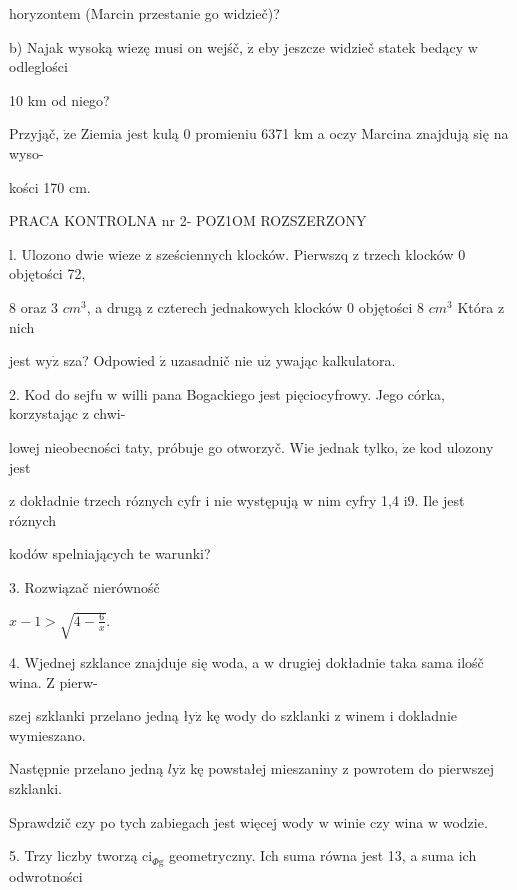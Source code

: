 \documentclass[a4paper,12pt]{article}
\begin{document}
horyzontem (Marcin przestanie go widzieč)?

b) Najak wysoką wiezę musi on wejśč, $\dot{\mathrm{z}}$ eby jeszcze widzieč statek bedący $\mathrm{w}$ odleglości

10 km od niego?

Przyjąč, $\dot{\mathrm{z}}\mathrm{e}$ Ziemia jest kulą $0$ promieniu 6371 km a oczy Marcina znajdują się na wyso-

kości 170 cm.




PRACA KONTROLNA nr 2- POZ1OM ROZSZERZONY

l. Ulozono dwie wieze $\mathrm{z}$ sześciennych klocków. Pierwszq $\mathrm{z}$ trzech klocków $0$ objętości 72,

8 oraz 3 $cm^{3}$, a drugą $\mathrm{z}$ czterech jednakowych klocków $0$ objętości 8 $cm^{3}$ Która $\mathrm{z}$ nich

jest $\mathrm{w}\mathrm{y}\dot{\mathrm{z}}$ sza? Odpowied $\acute{\mathrm{z}}$ uzasadnič nie $\mathrm{u}\dot{\mathrm{z}}$ ywając kalkulatora.

2. Kod do sejfu $\mathrm{w}$ willi pana Bogackiego jest pięciocyfrowy. Jego córka, korzystając $\mathrm{z}$ chwi-

lowej nieobecności taty, próbuje go otworzyč. Wie jednak tylko, $\dot{\mathrm{z}}\mathrm{e}$ kod ulozony jest

$\mathrm{z}$ dokładnie trzech róznych cyfr $\mathrm{i}$ nie występują $\mathrm{w}$ nim cyfry 1,4 $\mathrm{i}9$. Ile jest róznych

kodów spelniających te warunki?

3. Rozwiązač nierównośč

$x-1>\sqrt{4-\frac{6}{x}}.$

4. Wjednej szklance znajduje się woda, a $\mathrm{w}$ drugiej dokładnie taka sama ilośč wina. $\mathrm{Z}$ pierw-

szej szklanki przelano jedną $\text{ł} \mathrm{y}\dot{\mathrm{z}}$ kę wody do szklanki $\mathrm{z}$ winem $\mathrm{i}$ dokladnie wymieszano.

Następnie przelano jedną $l\mathrm{y}\dot{\mathrm{z}}$ kę powstałej mieszaniny $\mathrm{z}$ powrotem do pierwszej szklanki.

Sprawdzič czy po tych zabiegach jest więcej wody $\mathrm{w}$ winie czy wina $\mathrm{w}$ wodzie.

5. Trzy liczby tworzą $\mathrm{c}\mathrm{i}_{\Phi \mathrm{g}}$ geometryczny. Ich suma równa jest 13, a suma ich odwrotności
\end{document}
